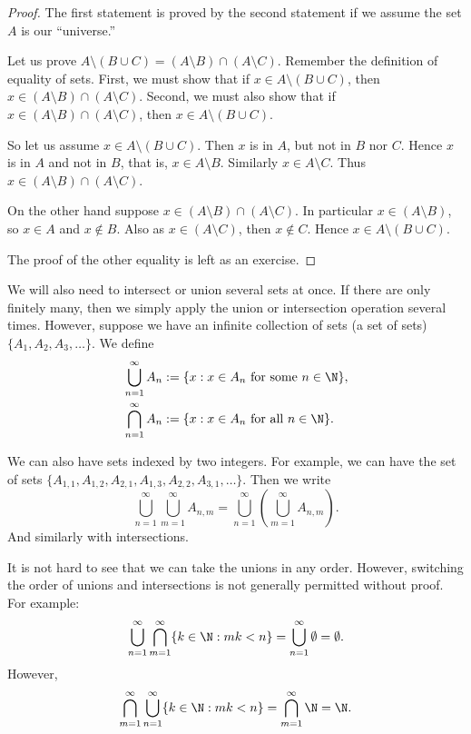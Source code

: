 \documentclass[12pt]{book}
\begin{document}
\begin{proof}
The first statement is proved by the second statement if we
assume the set $A$ is our ``universe.''

Let us prove $A \setminus (B \cup C) = (A \setminus B) \cap (A \setminus C)$.
Remember the definition of equality of sets.
 First, we must show that
if $x \in A \setminus (B \cup C)$, then
$x \in (A \setminus B) \cap (A \setminus C)$.
 Second, we must also show that
if $x \in (A \setminus B) \cap (A \setminus C)$, then
$x \in A \setminus (B \cup C)$.

So let us assume $x \in A \setminus (B \cup C)$.
 Then $x$ is in 
$A$, but not in $B$ nor $C$.
 Hence $x$ is in $A$ and not in $B$, that is,
$x \in A \setminus B$.
 Similarly $x \in A \setminus C$.
 Thus
$x \in (A \setminus B) \cap (A \setminus C)$.

On the other hand suppose 
$x \in (A \setminus B) \cap (A \setminus C)$.
 In particular
$x \in (A \setminus B)$, so 
$x \in A$ and $x \notin B$.
 Also as $x \in (A \setminus C)$, then $x \notin C$.
Hence $x \in A \setminus (B \cup C)$.

The proof of the other equality is left as an exercise.
\end{proof}

We will also need to intersect or union several sets at once.
 If there are
only finitely many, then we simply apply the union or intersection operation
several times.
 However, suppose we have an infinite collection
of sets (a set of sets)
$\{ A_1, A_2, A_3, \ldots \}$.
 We define
\begin{align*}
& \bigcup_{n=1}^\infty A_n := \{ x : x \in A_n \text{ for some $n \in \N$}
\} , \\
& \bigcap_{n=1}^\infty A_n := \{ x : x \in A_n \text{ for all $n \in \N$}
\} .
\end{align*}

We can also have sets indexed by two integers.
 For example, we can have
the set of sets
$\{ A_{1,1}, A_{1,2}, A_{2,1}, A_{1,3}, A_{2,2}, A_{3,1}, \ldots \}$.
 Then
we write 
\begin{equation*}
\bigcup_{n=1}^\infty \bigcup_{m=1}^\infty A_{n,m}
=
\bigcup_{n=1}^\infty \left( \bigcup_{m=1}^\infty A_{n,m} \right) .
\end{equation*}
And similarly with intersections.

It is not hard to see that we can take the unions in any order.  However,
switching the order of unions and intersections is not generally permitted without proof.
For example:
\begin{equation*}
\bigcup_{n=1}^\infty
\bigcap_{m=1}^\infty
\{ k \in \N : mk < n \}
=
\bigcup_{n=1}^\infty \emptyset = \emptyset .
\end{equation*}
However,
\begin{equation*}
\bigcap_{m=1}^\infty
\bigcup_{n=1}^\infty
\{ k \in \N : mk < n \}
=
\bigcap_{m=1}^\infty
\N
=
\N.
\end{equation*}
\end{document}
